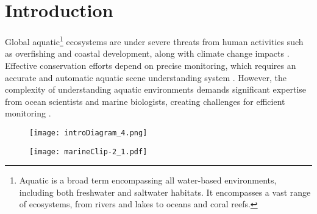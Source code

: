 \section{Introduction}
\label{sec:intro}
Global aquatic\footnote{Aquatic is a broad term encompassing all water-based environments, including both freshwater and saltwater habitats. It encompasses a vast range of ecosystems, from rivers and lakes to oceans and coral reefs.}  ecosystems are under severe threats from human activities such as overfishing and coastal development, along with climate change impacts \cite{doney2012climate, halpern2008global, jennings1998effects, zhou2022geological}. Effective conservation efforts depend on precise monitoring, which requires an accurate and automatic aquatic scene understanding system \cite{duarte2020rebuilding,grorud2021mpa}. However, the complexity of understanding aquatic environments demands significant expertise from ocean scientists and marine biologists, creating challenges for efficient monitoring \cite{zheng2023marinegpt,saleh2022computer}.


\captionsetup{type=figure}
\begin{figure*}
\begin{center}
    \centering
    \begin{subfigure} %
        \centering
        \texttt{[image: introDiagram\_4.png]} 
    \end{subfigure}      
    \begin{subfigure} %
        \centering
        \texttt{[image: marineClip-2\_1.pdf]}
    \end{subfigure}
     \vspace{-4mm}
     \caption{\textbf{(a) Step 1:} \textit{Two Million Aquatic Image-Text Pairs.} 
The dataset consists of paired aquatic images and enriched textual descriptions, which serve as input to the model. 
\textbf{(b) Step 2:} \textit{Contrastive Loss Pretraining}. Text and image pairs are processed by a text encoder and an image encoder.
The embeddings are aligned through contrastive loss, reducing the distance between matching pairs and improving the model's ability to associate images with their corresponding textual descriptions. \textbf{(c) Step 3:} \textit{Downstream Analysis.} AquaticCLIP performance is evaluated across various tasks such as zero-shot marine species classification, fine-tuned instance and semantic segmentation, object detection, and biodiversity counting in underwater imagery.}
\vspace{-1mm}
    \label{fig1}    
\end{center}
\end{figure*}


